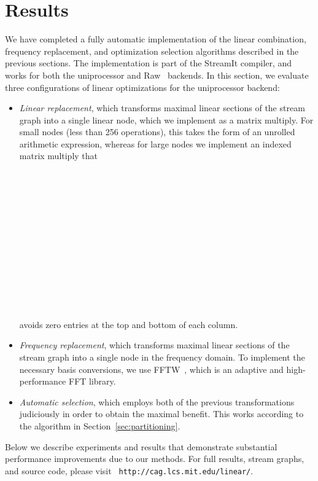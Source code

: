 \section{Results}
\label{sec:results}

We have completed a fully automatic implementation of the linear
combination, frequency replacement, and optimization selection
algorithms described in the previous sections.  The implementation is
part of the StreamIt compiler, and works for both the uniprocessor and
Raw~\cite{raw-micro} backends.  In this section, we evaluate three
configurations of linear optimizations for the uniprocessor backend:
\begin{itemize}

\item {\it Linear replacement}, which transforms maximal linear
sections of the stream graph into a single linear node, which we
implement as a matrix multiply.  For small nodes (less than 256
operations), this takes the form of an unrolled arithmetic expression,
whereas for large nodes we implement an indexed matrix multiply that \\
~ \\
~ \\
~ \\
~ \\
~ \\
~ \\
~ \\
~ \\
~ \\
~ \\
~ \\
~ \\
~ \\
avoids zero entries at the top and bottom of each column.

\item {\it Frequency replacement}, which transforms maximal linear
sections of the stream graph into a single node in the frequency
domain.  To implement the necessary basis conversions, we use
FFTW~\cite{frigo99fast}, which is an adaptive and high-performance FFT
library.

\item {\it Automatic selection}, which employs both of the previous
transformations judiciously in order to obtain the maximal benefit.
This works according to the algorithm in
Section~\ref{sec:partitioning}.
\end{itemize}
Below we describe experiments and results that demonstrate substantial
performance improvements due to our methods.  For full results, stream
graphs, and source code, please visit {\tt
http://cag.lcs.mit.edu/linear/}.

